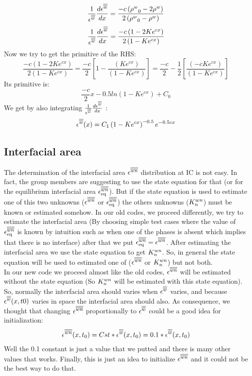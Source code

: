 \documentclass{article}
\begin{document}
\begin{equation}
  \frac{1}{{{{\epsilon}^{{\overline{\overline{w}}}}}}}\frac{d {{{\epsilon}^{{\overline{\overline{w}}}}}}}{dx}
=\frac{-c\left({{{\rho^{w}}}}_0-2{{{\rho^{w}}}} \right)}{2\left({{{\rho^{w}}}}_0-{{\rho^{w}}} \right)}
\label{eq:TCAT_eq1_5}
\end{equation}
\begin{equation}
  \frac{1}{{{{\epsilon}^{{\overline{\overline{w}}}}}}}\frac{d {{{\epsilon}^{{\overline{\overline{w}}}}}}}{dx}
=\frac{-c\left(1-2 Ke^{cx} \right)}{2\left(1- Ke^{cx} \right)}
\label{eq:TCAT_eq1_6}
\end{equation}
Now we try to get the primitive of the RHS:
\begin{equation}
\frac{-c\left(1-2 Ke^{cx} \right)}{2\left(1- Ke^{cx} \right)}
= \frac{-c}{2}\left[1-\frac{\left( Ke^{cx} \right)}{\left(1- Ke^{cx} \right)} \right]
=\frac{-c}{2}-\frac{1}{2}\left[\frac{\left( -cKe^{cx} \right)}{\left(1- Ke^{cx} \right)}\right]
\label{eq:RHS}
\end{equation}
Its primitive is:
\begin{equation}
\frac{-c}{2}x-0.5ln(1-Ke^{cx})+C_0
\label{eq:RHS_2}
\end{equation}
We get by also integrating \(\frac{1}{{{{\epsilon}^{{\overline{\overline{w}}}}}}}\frac{d {{{\epsilon}^{{\overline{\overline{w}}}}}}}{dx}\) : 
\begin{equation}
{{{\ensuremath{\epsilon}}^{{\overline{\overline{w}}}}}}(x)=C_1\left(1-Ke^{cx}\right)^{-0.5}e^{-0.5cx} 
\label{eq:ew_expression}
\end{equation}
\subsection{Interfacial area }
The determination of the interfacial area \({{{\epsilon}^{{\overline{\overline{{wn}}}}}}}\) distribution at IC is not easy. In fact, the group members are suggesting to use the state equation for that (or for the equilibrium interfacial area \({{\epsilon}}^{{\overline{\overline{{wn}}}}}_{\rm{eq}}\)). But if the state equation is used to estimate one of this two unknowns (\({{{\epsilon}^{{\overline{\overline{{wn}}}}}}}\) or \({{\epsilon}}^{{\overline{\overline{{wn}}}}}_{\rm{eq}}\)) the others unknowns (\(K_n^{wn}\)) must be known or estimated somehow. In our old codes, we proceed differently, we try to estimate the interfacial area (By choosing simple test cases where the value of \({{\epsilon}}^{{\overline{\overline{{wn}}}}}_{\rm{eq}}\) is known by intuition such as when one of the phases is absent which implies that there is no interface) after that we put \({{\epsilon}}^{{\overline{\overline{{wn}}}}}_{\rm{eq}}={{{\epsilon}^{{\overline{\overline{{wn}}}}}}}\). After estimating the interfacial area we use the state equation to get \(K_n^{wn}\). So, in general the state equation will be used to estimated one of (\({{{\epsilon}^{{\overline{\overline{{wn}}}}}}}\) or \(K_n^{wn}\)) but not both.\\
In our new code we proceed almost like the old codes, \({{{\epsilon}^{{\overline{\overline{{wn}}}}}}}\) will be estimated without the state equation (So \(K_n^{wn}\) will be estimated with this state equation). So, normally the interfacial area should varies when \({{{\epsilon}^{{\overline{\overline{w}}}}}}\) varies, and because \({{{\epsilon}^{{\overline{\overline{w}}}}}}(x,t0)\) varies in space the interfacial area should also. As consequence, we thought that changing \({{{\epsilon}^{{\overline{\overline{{wn}}}}}}}\) proportionally to \({{{\epsilon}^{{\overline{\overline{w}}}}}}\) could be a good idea for initialization:
\begin{equation}
{{{\ensuremath{\epsilon}}^{{\overline{\overline{{\ensuremath{wn}}}}}}}}(x,t_0)=Cst*{{{\epsilon}^{{\overline{\overline{w}}}}}}(x,t_0)=0.1*{{{\epsilon}^{{\overline{\overline{w}}}}}}(x,t_0)
\label{eq:ewn_expression}
\end{equation}
Well the 0.1 constant is just a value that we putted and there is many other values that works. Finally, this is just an idea to initialize \({{{\epsilon}^{{\overline{\overline{{wn}}}}}}}\) and it could not be the best way to do that.
\end{document}
